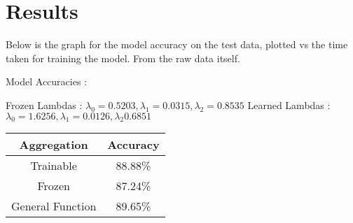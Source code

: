 \section*{Results}
\label{sec:results}

Below is the graph for the model accuracy on the test data, plotted vs the time taken for training the model. From the raw data itself.

Model Accuracies : 

Frozen Lambdas : $\lambda_{0} = 0.5203, \lambda_{1} = 0.0315, \lambda_{2} = 0.8535$
Learned Lambdas : $\lambda_{0} = 1.6256, \lambda_{1} =  0.0126, \lambda_{2} 0.6851$

\begin{table}[H]
    \centering
\begin{tabular}{|c|c|}
\hline
\textbf{Aggregation} & \textbf{Accuracy} \\
\hline
 Trainable & 88.88\% \\
\hline
Frozen  & 87.24\% \\
\hline
General Function  & 89.65\% \\
\hline
\end{tabular}
\end{table}

